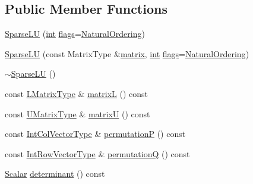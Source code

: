 \subsection*{Public Member Functions}
\begin{DoxyCompactItemize}
\item 
\hyperlink{class_sparse_l_u_3_01_matrix_type_00_01_super_l_u_01_4_ae09b40bf905585895577b644feac096c}{Sparse\-L\-U} (\hyperlink{ioapi_8h_a787fa3cf048117ba7123753c1e74fcd6}{int} \hyperlink{class_sparse_l_u_a615b2637e9c72a9ae9ceb297f5a200ea}{flags}=\hyperlink{_sparse_util_8h_ad4a9934b75947f1fae21deee31688bb7acda9685a1ef5c7d3165275024473d9e1}{Natural\-Ordering})
\item 
\hyperlink{class_sparse_l_u_3_01_matrix_type_00_01_super_l_u_01_4_a2d5e9b2a9d55f33d8ba897bb62dd0f7a}{Sparse\-L\-U} (const Matrix\-Type \&\hyperlink{glext_8h_a7b24a3f2f56eb1244ae69dacb4fecb6f}{matrix}, \hyperlink{ioapi_8h_a787fa3cf048117ba7123753c1e74fcd6}{int} \hyperlink{class_sparse_l_u_a615b2637e9c72a9ae9ceb297f5a200ea}{flags}=\hyperlink{_sparse_util_8h_ad4a9934b75947f1fae21deee31688bb7acda9685a1ef5c7d3165275024473d9e1}{Natural\-Ordering})
\item 
\hyperlink{class_sparse_l_u_3_01_matrix_type_00_01_super_l_u_01_4_a549ac1c614e929cf0b4dcb1fa84d336e}{$\sim$\-Sparse\-L\-U} ()
\item 
const \hyperlink{class_sparse_l_u_3_01_matrix_type_00_01_super_l_u_01_4_a456d27de5a655bef64e8d749e80e3aad}{L\-Matrix\-Type} \& \hyperlink{class_sparse_l_u_3_01_matrix_type_00_01_super_l_u_01_4_ac3a90d23048f3a4507c443a405ee6005}{matrix\-L} () const 
\item 
const \hyperlink{class_sparse_l_u_3_01_matrix_type_00_01_super_l_u_01_4_ae359d4920c56a9ac93bc728bc0d04b77}{U\-Matrix\-Type} \& \hyperlink{class_sparse_l_u_3_01_matrix_type_00_01_super_l_u_01_4_a083b67b56cedbf21fbd2e9aa94a79480}{matrix\-U} () const 
\item 
const \hyperlink{class_sparse_l_u_3_01_matrix_type_00_01_super_l_u_01_4_a904f8c9f7dcd198fcc6fd897cec1ac8e}{Int\-Col\-Vector\-Type} \& \hyperlink{class_sparse_l_u_3_01_matrix_type_00_01_super_l_u_01_4_a748b956992e5d79867327c24e7dcef1d}{permutation\-P} () const 
\item 
const \hyperlink{class_sparse_l_u_3_01_matrix_type_00_01_super_l_u_01_4_a341f04a651379c2395a17abc5a566ccf}{Int\-Row\-Vector\-Type} \& \hyperlink{class_sparse_l_u_3_01_matrix_type_00_01_super_l_u_01_4_a704ec2b3211c873bb428598a5c709367}{permutation\-Q} () const 
\item 
\hyperlink{class_sparse_l_u_3_01_matrix_type_00_01_super_l_u_01_4_ae21a6c1f9f89d9345035a47e161d8ac7}{Scalar} \hyperlink{class_sparse_l_u_3_01_matrix_type_00_01_super_l_u_01_4_a73df29b7d95500ca82d4db8145ce2d50}{determinant} () const 

\end{DoxyCompactItemize}
